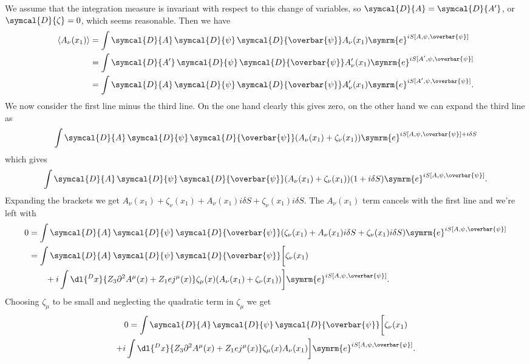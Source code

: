 \documentclass[fleqn]{NotesClass}
\newcommand{\e}{\symrm{e}}
\newcommand{\diracadjoint}[1]{\overbar{#1}}
\newcommand{\DL}[1]{\symcal{D}{#1}}
\newcommand{\DD}[1]{\,\symcal{D}{#1}}
\DeclarePairedDelimiter{\correlator}{\langle}{\rangle}
\newcommand{\dalembertian}{\partial^2}
\begin{document}
    We assume that the integration measure is invariant with respect to this change of variables, so \(\DL{A} = \DL{A'}\), or \(\DL{\zeta} = 0\), which seems reasonable.
    Then we have
    \begin{align}
        \correlator{A_\nu(x_1)} &= \int \DL{A} \DD{\psi} \DD{\diracadjoint{\psi}} A_\nu(x_1) \e^{iS[A, \psi, \diracadjoint{\psi}]}\\
        &= \int \DL{A'} \DD{\psi} \DD{\diracadjoint{\psi}} A'_\nu(x_1) \e^{iS[A', \psi, \diracadjoint{\psi}]}\\
        &= \int \DL{A} \DD{\psi} \DD{\diracadjoint{\psi}} A'_\nu(x_1) \e^{iS[A', \psi, \diracadjoint{\psi}]}.
    \end{align}
    We now consider the first line minus the third line.
    On the one hand clearly this gives zero, on the other hand we can expand the third line as
    \begin{equation}
        \int \DL{A} \DD{\psi} \DD{\diracadjoint{\psi}} (A_\nu(x_1) + \zeta_\nu(x_1))\e^{iS[A, \psi, \diracadjoint{\psi}] + i\delta S}
    \end{equation}
    which gives
    \begin{equation}
        \int \DL{A} \DD{\psi} \DD{\diracadjoint{\psi}} (A_\nu(x_1) + \zeta_\nu(x_1))(1 + i\delta S)\e^{iS[A, \psi, \diracadjoint{\psi}]}.
    \end{equation}
    Expanding the brackets we get \(A_\nu(x_1) + \zeta_\nu(x_1) + A_\nu(x_1) i\delta S + \zeta_\nu(x_1) i\delta S\).
    The \(A_\nu(x_1)\) term cancels with the first line and we're left with
    \begin{align}
        0 &= \int \DL{A} \DD{\psi} \DD{\diracadjoint{\psi}} (\zeta_\nu(x_1) + A_\nu(x_1) i\delta S + \zeta_\nu(x_1) i\delta S) \e^{iS[A, \psi, \diracadjoint{\psi}]}\\
        &= \int \DL{A} \DD{\psi} \DD{\diracadjoint{\psi}} \bigg[\zeta_\nu(x_1) \notag\\
        &\qquad + i \int\dl{^Dx} \{Z_3 \dalembertian A^\mu(x) + Z_1 ej^\mu(x)\}\zeta_\mu(x)(A_\nu(x_1) + \zeta_\nu(x_1))\bigg] \e^{iS[A, \psi, \diracadjoint{\psi}]}.
    \end{align}
    Choosing \(\zeta_\mu\) to be small and neglecting the quadratic term in \(\zeta_\mu\) we get
    \begin{multline}
        0 = \int \DL{A} \DD{\psi} \DD{\diracadjoint{\psi}} \bigg[\zeta_\nu(x_1) \notag\\
        + i \int\dl{^Dx} \{Z_3 \dalembertian A^\mu(x) + Z_1 ej^\mu(x)\}\zeta_\mu(x)A_\nu(x_1)\bigg] \e^{iS[A, \psi, \diracadjoint{\psi}]}.
    \end{multline}
\end{document}
